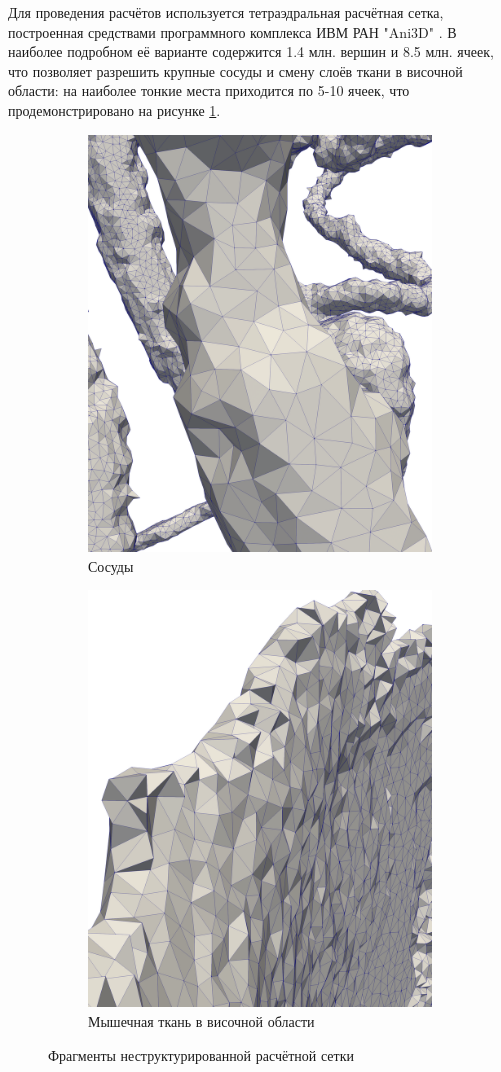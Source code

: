 \documentclass[a4paper]{article}
\numberwithin{equation}{section}
\begin{document}
Для проведения расчётов используется тетраэдральная расчётная сетка, построенная средствами 
программного комплекса ИВМ РАН "Ani3D" \cite{ani3d}. 
В наиболее подробном её варианте содержится 1.4 млн. вершин и 8.5 млн. ячеек, 
что позволяет разрешить крупные сосуды и смену слоёв ткани в височной области: 
на наиболее тонкие места приходится по 5-10 ячеек, что продемонстрировано на рисунке 
\ref{fig:refined-grid}. 
\begin{figure}[H]
\centering
\begin{subfigure}{.4\textwidth}
  \centering
  \includegraphics[width=0.7\linewidth]{pictures/skull/grid-vessels.png}
  \caption{Сосуды}
\end{subfigure}%
\begin{subfigure}{.4\textwidth}
  \centering
  \includegraphics[width=0.7\linewidth]{pictures/skull/grid-muscles.png}
  \caption{Мышечная ткань в височной области}
\end{subfigure}
\caption{Фрагменты неструктурированной расчётной сетки}
\label{fig:refined-grid}
\end{figure}
\end{document}
